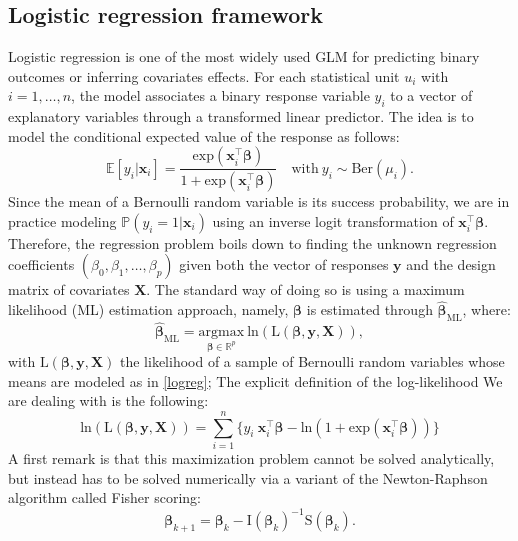 \documentclass{article}
\begin{document}
\subsection{Logistic regression framework}
Logistic regression is one of the most widely used GLM for predicting binary outcomes or inferring covariates effects. For each statistical unit $u_i$ with $i=1,\dots,n$, the model associates a binary response variable $y_i$ to a vector of explanatory variables through a transformed linear predictor. The idea is to model the conditional expected value of the response as follows:
\begin{equation}
\mathbb{E}[y_i|\boldsymbol{x}_i]=\frac{\text{exp}(\mathbf{x}_i^\top\boldsymbol{\beta})}{1+\text{exp}(\mathbf{x}_i^\top\boldsymbol{\beta})}\quad\text{with}\ y_i\sim\text{Ber}(\mu_i).
\label{logreg}
\end{equation}
Since the mean of a Bernoulli random variable is its success probability, we are in practice modeling $\mathbb{P}(y_i=1|\mathbf{x}_i)$ using an inverse logit transformation of $\mathbf{x}_i^\top\boldsymbol{\beta}$. Therefore, the regression problem boils down to finding the unknown regression coefficients $(\beta_0,\beta_1,\dots,\beta_p)$ given both the vector of responses $\mathbf{y}$ and the design matrix of covariates $\mathbf{X}$. The standard way of doing so is using a maximum likelihood (ML) estimation approach, namely, $\boldsymbol{\beta}$ is estimated through $\hat{\boldsymbol{\beta}}_{\text{ML}}$, where:
\begin{equation*}
\hat{\boldsymbol{\beta}}_\text{ML}=\underset{\boldsymbol{\beta}\in\mathbb{R}^p}{\text{argmax}}\ \text{ln}(\text{L}(\boldsymbol{\beta},\mathbf{y},\mathbf{X})),
\end{equation*}
with $\text{L}(\boldsymbol{\beta},\mathbf{y},\mathbf{X})$ the likelihood of a sample of Bernoulli random variables whose means are modeled as in \eqref{logreg}; The explicit definition of the log-likelihood 
We are dealing with is the following: 
\begin{equation}
\text{ln}(\text{L}(\boldsymbol{\beta},\mathbf{y},\mathbf{X}))=\overset{n}{\underset{i=1}{\sum}}\{y_i\ \mathbf{x}_i^\top\boldsymbol{\beta}-\text{ln}(1+\text{exp}(\mathbf{x}_i^\top \boldsymbol{\beta}))\}
\label{standL}
\end{equation}
A first remark is that this maximization problem cannot be solved analytically, but instead has to be solved numerically via a variant of the Newton-Raphson algorithm called Fisher scoring:
\begin{equation}
\boldsymbol{\beta}_{k+1}=\boldsymbol{\beta}_k-\text{I}(\boldsymbol{\beta}_k)^{-1}\text{S}(\boldsymbol{\beta}_k).
\label{fishsco}
\end{equation}
\end{document}
